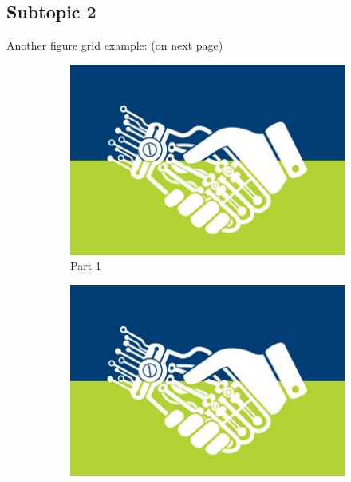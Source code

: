 \subsection{Subtopic 2}
\lipsum[1]

\noindent Another figure grid example: (on next page)

\begin{figure}[ht]
\begin{multicols}{2}
        \centering
        \begin{subfigure}[b]{0.475\textwidth}
            \centering
            \includegraphics[width=\textwidth]{img/bioeng.jpg}
            \caption{Part 1}    
        \end{subfigure}
        \hfill
        \begin{subfigure}[b]{0.475\textwidth}  
            \centering 
            \includegraphics[width=\textwidth]{img/bioeng.jpg}

\end{subfigure}
\end{multicols}
\end{figure}
